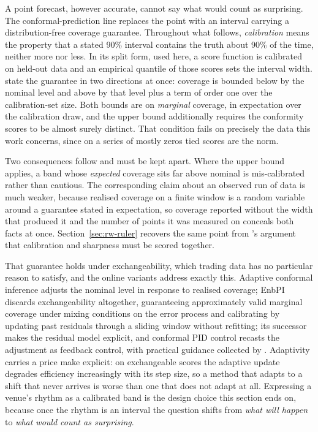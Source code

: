 A point forecast, however accurate, cannot say what would count as surprising.
The conformal-prediction line replaces the point with an interval carrying a
distribution-free coverage guarantee. Throughout what follows,
\emph{calibration} means the property that a stated 90\% interval contains the
truth about 90\% of the time, neither more nor less. In its split form, used
here, a score function is calibrated on held-out data and an empirical quantile
of those scores sets the interval width. \citet{angelopoulos_conformal_2023}
state the guarantee in two directions at once: coverage is bounded below by the
nominal level and above by that level plus a term of order one over the
calibration-set size. Both bounds are on \emph{marginal} coverage, in expectation
over the calibration draw, and the upper bound additionally requires the
conformity scores to be almost surely distinct. That condition fails on precisely
the data this work concerns, since on a series of mostly zeros tied scores are
the norm.

Two consequences follow and must be kept apart. Where the upper bound applies, a
band whose \emph{expected} coverage sits far above nominal is mis-calibrated
rather than cautious. The corresponding claim about an observed run of data is
much weaker, because realised coverage on a finite window is a random variable
around a guarantee stated in expectation, so coverage reported without the width
that produced it and the number of points it was measured on conceals both facts
at once. Section~\ref{sec:rw-ruler} recovers the same point from
\citeauthor{kolassa_evaluating_2016}'s argument that calibration and sharpness
must be scored together.

That guarantee holds under exchangeability, which trading data has no particular
reason to satisfy, and the online variants address exactly this. Adaptive
conformal inference \citep{gibbs_adaptive_2021} adjusts the nominal level in
response to realised coverage; EnbPI \citep{xu_conformal_2021} discards
exchangeability altogether, guaranteeing approximately valid marginal coverage
under mixing conditions on the error process and calibrating by updating past
residuals through a sliding window without refitting; its successor
\citep{xu_sequential_2023} makes the residual model explicit, and conformal PID
control \citep{angelopoulos_conformal_2023-1} recasts the adjustment as feedback
control, with practical guidance collected by
\citet[a 2025 preprint]{stocker_gentle_2025}. Adaptivity carries a price
\citet{zaffran_adaptive_2022} make explicit: on exchangeable scores the adaptive
update degrades efficiency increasingly with its step size, so a method that
adapts to a shift that never arrives is worse than one that does not adapt at
all. Expressing a venue's rhythm as a calibrated band is the design choice this
section ends on, because once the rhythm is an interval the question shifts from
\emph{what will happen} to \emph{what would count as surprising}.

